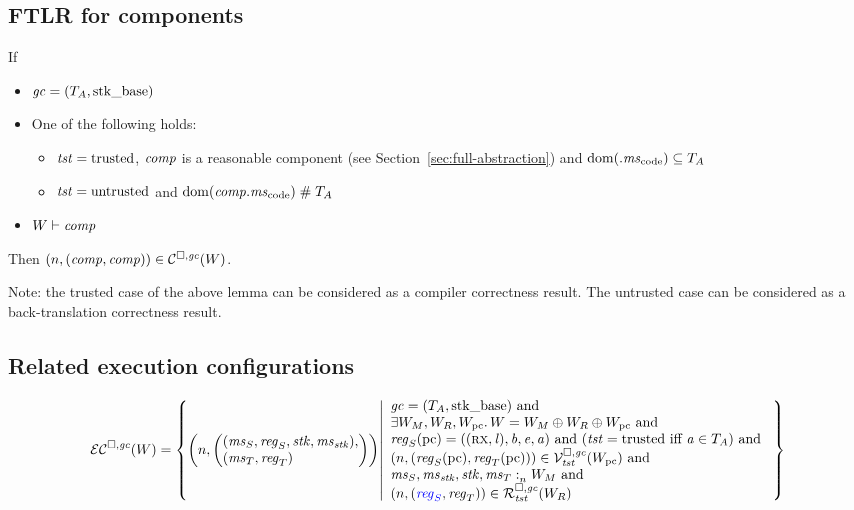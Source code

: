 \documentclass[a4paper]{article}
\begin{document}
\subsection{FTLR for components}
\label{sec:ftlr-for-comps}

\begin{lemma}
  If
  \begin{itemize}
  \item $\mathit{gc} = (T_{A},\mathrm{stk\_base})$
  \item One of the following holds:
    \begin{itemize}
    \item $\mathit{tst} = \mathrm{trusted}$, $\mathit{comp}$ is a reasonable component (see
      Section~\ref{sec:full-abstraction}) and $\dom(\comp.\mscode) \subseteq \ta$
    \item $\mathit{tst} = \mathrm{untrusted}$ and $\dom(\var{comp}.\mscode) \mathrel{\#} \ta$
    \end{itemize}
  \item $W \vdash \mathit{comp}$
  \end{itemize}
  Then $\left(n,(\mathit{comp},\mathit{comp})\right) \in \mathcal{C}^{\square,\mathit{gc}}(W)$.
\end{lemma}
Note: the trusted case of the above lemma can be considered as a compiler correctness result.
The untrusted case can be considered as a back-translation correctness result.

\subsection{Related execution configurations}
\label{sec:related-exec-confs}

\[
  \lrec(W) = \left\{ \npair{\left(
        \arraycolsep=0pt\array{l}
        (\ms_S,\reg_S,\stk,\ms_\stk),\\
        (\ms_T,\reg_T)\endarray\right)} \middle|
    \begin{array}{l}
      \gc = (\ta,\stkb) \tand\\
      \exists W_M,W_R,W_\pcreg \ldotp W = W_M \oplus W_R \oplus W_\pcreg \tand\\
      \reg_S(\pcreg) = ((\rx,\lin),\baddr,\eaddr,\aaddr) \tand (\trust = \trusted \text{ iff } \aaddr \in \ta) \tand \\
      \npair{( \reg_S(\pcreg),\reg_T(\pcreg) )} \in \lrvg{\trust}(W_\pcreg) \tand \\
      \memSat{\ms_S,\ms_\stk,\stk,\ms_T}{W_M} \tand\\
      \npair{\stpair{\reg}{\reg}} \in \lrrg{\trust}(W_R)
    \end{array}
            \right\}
\]
\end{document}
